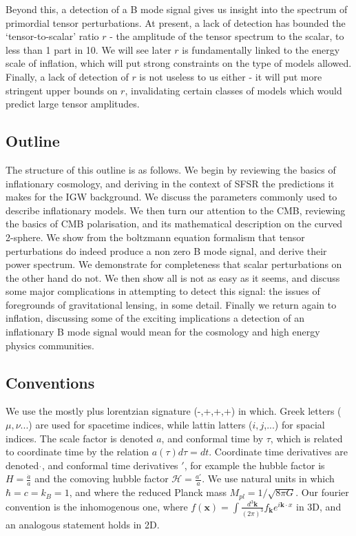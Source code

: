 \documentclass[a4paper,10pt]{article}
\renewcommand{\v}[1]{\mathbf{#1}}
\newcommand{\Mp}{M_{pl}}
\newcommand{\fint}[1]{\int \frac{d^3 \v{#1}}{(2\pi)^3}}
\begin{document}
Beyond this, a detection of a B mode signal gives us insight into the spectrum of primordial tensor perturbations. At present, a lack of detection has bounded the `tensor-to-scalar' ratio $r$ - the amplitude of the tensor spectrum to the scalar, to less than 1 part in 10. We will see later $r$ is fundamentally linked to the energy scale of inflation, which will put strong constraints on the type of models allowed. Finally, a lack of detection of $r$ is not useless to us either - it will put more stringent upper bounds on $r$, invalidating certain classes of models which would predict large tensor amplitudes.\\

\subsection{Outline}

The structure of this outline is as follows. We begin by reviewing the basics of inflationary cosmology, and deriving in the context of SFSR the predictions it makes for the IGW background. We discuss the parameters commonly used to describe inflationary models. We then turn our attention to the CMB, reviewing the basics of CMB polarisation, and its mathematical description on the curved 2-sphere. We show from the boltzmann equation formalism that tensor perturbations do indeed produce a non zero B mode signal, and derive their power spectrum. We demonstrate for completeness that scalar perturbations on the other hand do not. We then show all is not as easy as it seems, and discuss some major complications in attempting to detect this signal: the issues of foregrounds of gravitational lensing, in some detail. Finally we return again to inflation, discussing some of the exciting implications a detection of an inflationary B mode signal would mean for the cosmology and high energy physics communities. 

\subsection{Conventions}

We use the mostly plus lorentzian signature (-,+,+,+) in which. Greek letters ($\mu,\nu$...) are used for spacetime indices, while lattin latters ($i,j$,...) for spacial indices. The scale factor is denoted $a$, and conformal time by $\tau$, which is related to coordinate time by the relation $a(\tau)d\tau = dt$. Coordinate time derivatives are denoted $\dot{}$, and conformal time derivatives $'$, for example the hubble factor is $H=\frac{\dot{a}}{a}$ and the comoving hubble factor $\mathcal{H}=\frac{a'}{a}$. We use natural units in which $\hbar=c=k_B=1$, and where the reduced Planck mass $\Mp = 1/\sqrt{8\pi G}$. Our fourier convention is the inhomogenous one, where $f(\v{x}) = \fint{k} f_\v{k}e^{i\v{k}\cdot{x}}$ in 3D, and an analogous statement holds in 2D.
\end{document}
